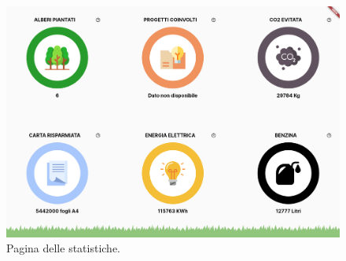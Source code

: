 \begin{figure}[h!]
  \centering
  \includegraphics[width=\textwidth]{img/totem/screenshot/statsCircle.png}
  \caption{Pagina delle statistiche.}
  \label{fig:statsPage}
\end{figure}
